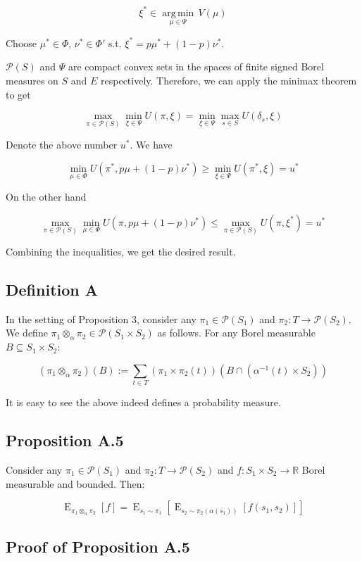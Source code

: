 \documentclass[a4paper]{article}
\DeclareMathOperator{\E}{E}
\newcommand{\Argmin}[1]{\underset{#1}{\operatorname{arg\,min}}\,}
\newcommand{\Reals}{\mathbb{R}}
\newcommand{\Prob}{\mathcal{P}}
\begin{document}
$$\xi^* \in \Argmin{\mu \in \Psi} V(\mu)$$

Choose ${\mu^* \in \Phi}$, ${\nu^* \in \Phi'}$ s.t. ${\xi^* = p \mu^* + (1-p) \nu^*}$.

${\Prob(S)}$ and ${\Psi}$ are compact convex sets in the spaces of finite signed Borel measures on ${S}$ and ${E}$ respectively. Therefore, we can apply the minimax theorem to get

$$\max_{\pi \in \Prob(S)} \min_{\xi \in \Psi} U(\pi,\xi) = \min_{\xi \in \Psi} \max_{s \in S} U(\delta_s,\xi)$$

Denote the above number ${u^*}$. We have

$$\min_{\mu \in \Phi} U(\pi^*,p\mu + (1-p)\nu^*) \geq \min_{\xi \in \Psi} U(\pi^*,\xi)=u^*$$

On the other hand

$$\max_{\pi \in \Prob(S)} \min_{\mu \in \Phi} U(\pi,p\mu + (1-p)\nu^*) \leq \max_{\pi \in \Prob(S)}  U(\pi,\xi^*)=u^*$$

Combining the inequalities, we get the desired result.

\subsection{Definition A}

In the setting of Proposition 3, consider any ${\pi_1 \in \Prob(S_1)}$ and ${\pi_2: T \rightarrow \Prob(S_2)}$. We define ${\pi_1 \otimes_\alpha \pi_2 \in \Prob(S_1 \times S_2)}$ as follows. For any Borel measurable ${B \subseteq S_1 \times S_2}$:

$$(\pi_1 \otimes_\alpha \pi_2)(B):=\sum_{t \in T} (\pi_1 \times \pi_2(t))(B \cap (\alpha^{-1}(t) \times S_2))$$ 

It is easy to see the above indeed defines a probability measure.

\subsection{Proposition A.5}

Consider any ${\pi_1 \in \Prob(S_1)}$ and ${\pi_2: T \rightarrow \Prob(S_2)}$ and ${f: S_1 \times S_2 \rightarrow \Reals}$ Borel measurable and bounded. Then:

$$\E_{\pi_1 \otimes_\alpha \pi_2}[f] = \E_{s_1 \sim \pi_1}[\E_{s_2 \sim \pi_2(\alpha(s_1))}[f(s_1, s_2)]]$$

\subsection{Proof of Proposition A.5}
\end{document}
